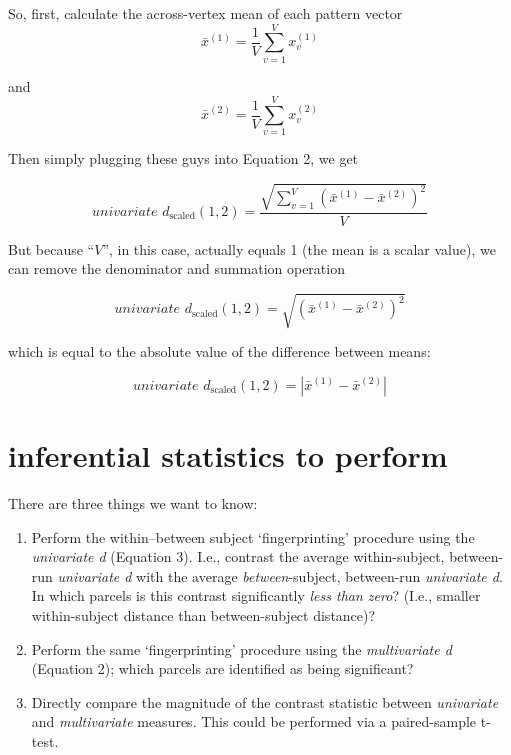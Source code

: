 \documentclass[]{article}
\begin{document}
So, first, calculate the across-vertex mean of each pattern vector
\[
\bar{x}^{(1)} = \frac{1}{V} \sum_{v = 1}^{V}{x}_v^{(1)}
\]

and 
\[
\bar{x}^{(2)} = \frac{1}{V} \sum_{v = 1}^{V}{x}_v^{(2)}
\]

Then simply plugging these guys into Equation 2, we get

\[
\textit{univariate d}_{\text{scaled}}(1, 2) = \frac{\sqrt{\sum_{v = 1}^{V}(\bar{x}^{(1)} - \bar{x}^{(2)})^2}}{V}
\]

But because ``$V$'', in this case, actually equals 1 (the mean is a scalar value), we can remove the denominator and summation operation

\[
\textit{univariate d}_{\text{scaled}}(1, 2) = \sqrt{(\bar{x}^{(1)} - \bar{x}^{(2)})^2}
\]

which is equal to the absolute value of the difference between means:

\begin{equation}
	\textit{univariate d}_{\text{scaled}}(1, 2) = |\bar{x}^{(1)} - \bar{x}^{(2)}|
\end{equation}


\section*{inferential statistics to perform}


There are three things we want to know:
\begin{enumerate}
	\item Perform the within--between subject `fingerprinting' procedure using the \textit{univariate d} (Equation 3). I.e., contrast the average within-subject, between-run \textit{univariate d} with the average \textit{between}-subject, between-run \textit{univariate d}.
	In which parcels is this contrast significantly \textit{less than zero}? (I.e., smaller within-subject distance than between-subject distance)?
	\item Perform the same `fingerprinting' procedure using the \textit{multivariate d} (Equation 2); which parcels are identified as being significant?
	\item Directly compare the magnitude of the contrast statistic between \textit{univariate} and \textit{multivariate} measures.
	This could be performed via a paired-sample t-test.
\end{enumerate}
\end{document}
